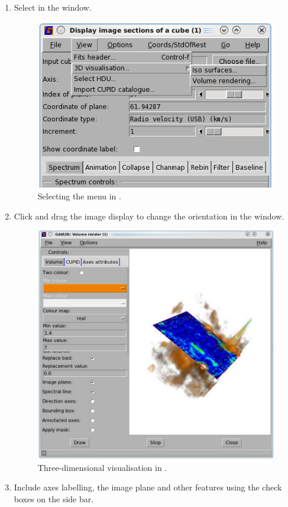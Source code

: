 \documentclass[11pt,oneside,chapters]{starlink}
\begin{document}
\begin{enumerate}[label=(\textbf{\arabic*})]
\item Select  in the  window.

\begin{figure}[h!]
\begin{center}
\includegraphics[width=0.45\linewidth]{sc20_gaia_3dmenu}
\caption[Selecting the Volume rendering menu in \gaia.]{\label{fig:gaia_3d}
  Selecting the  menu in \gaia.}
\end{center}
\end{figure}

\item Click and drag the image display to change the orientation in
the  window.

\begin{figure}[h!]
\begin{center}
\includegraphics[width=0.6\linewidth]{sc20_gaia-3dvolume2}
\caption[Three-dimensional visualisation in \gaia.]{\label{fig:gaia_3d2}
  Three-dimensional visualisation in \gaia.}
\end{center}
\end{figure}

\item Include axes labelling, the image plane and other features using
the check boxes on the side bar.
\end{enumerate}
\end{document}
